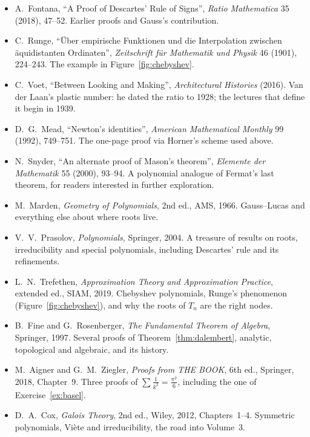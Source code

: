 \begin{itemize}
\item A.~Fontana, ``A Proof of Descartes' Rule of Signs'', \emph{Ratio Mathematica} 35 (2018), 47--52. Earlier proofs and Gauss's contribution.
\item C.~Runge, ``\"Uber empirische Funktionen und die Interpolation zwischen \"aquidistanten Ordinaten'', \emph{Zeitschrift f\"ur Mathematik und Physik} 46 (1901), 224--243. The example in Figure~\ref{fig:chebyshev}.
\item C.~Voet, ``Between Looking and Making'', \emph{Architectural Histories} (2016). Van der Laan's plastic number: he dated the ratio to 1928; the lectures that define it begin in 1939.
\item D.~G.~Mead, ``Newton's identities'', \emph{American Mathematical Monthly} 99 (1992), 749--751. The one-page proof via Horner's scheme used above.
\item N.~Snyder, ``An alternate proof of Mason's theorem'', \emph{Elemente der Mathematik} 55 (2000), 93--94. A polynomial analogue of Fermat's last theorem, for readers interested in further exploration.
\item M.~Marden, \emph{Geometry of Polynomials}, 2nd ed., AMS, 1966. Gauss--Lucas and everything else about where roots live.
\item V.~V.~Prasolov, \emph{Polynomials}, Springer, 2004. A treasure of results on roots, irreducibility and special polynomials, including Descartes' rule and its refinements.
\item L.~N.~Trefethen, \emph{Approximation Theory and Approximation Practice}, extended ed., SIAM, 2019. Chebyshev polynomials, Runge's phenomenon (Figure~\ref{fig:chebyshev}), and why the roots of $T_n$ are the right nodes.
\item B.~Fine and G.~Rosenberger, \emph{The Fundamental Theorem of Algebra}, Springer, 1997. Several proofs of Theorem~\ref{thm:dalembert}, analytic, topological and algebraic, and its history.
\item M.~Aigner and G.~M.~Ziegler, \emph{Proofs from THE BOOK}, 6th ed., Springer, 2018, Chapter~9. Three proofs of $\sum\frac1{k^2}=\frac{\pi^2}6$, including the one of Exercise~\ref{ex:basel}.
\item D.~A.~Cox, \emph{Galois Theory}, 2nd ed., Wiley, 2012, Chapters~1--4. Symmetric polynomials, Vi\`ete and irreducibility, the road into Volume~3.
\end{itemize}
